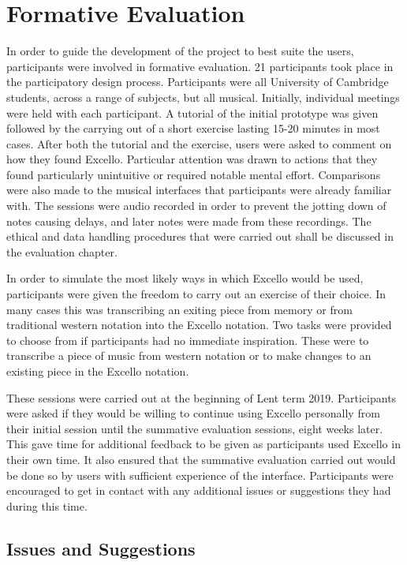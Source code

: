 \section{Formative Evaluation}

In order to guide the development of the project to best suite the users, participants were involved in formative evaluation. 21 participants took place in the participatory design process. Participants were all University of Cambridge students, across a range of subjects, but all musical. Initially, individual meetings were held with each participant. A tutorial of the initial prototype was given followed by the carrying out of a short exercise lasting 15-20 minutes in most cases. After both the tutorial and the exercise, users were asked to comment on how they found Excello. Particular attention was drawn to actions that they found particularly unintuitive or required notable mental effort. Comparisons were also made to the musical interfaces that participants were already familiar with. The sessions were audio recorded in order to prevent the jotting down of notes causing delays, and later notes were made from these recordings. The ethical and data handling procedures that were carried out shall be discussed in the evaluation chapter.

In order to simulate the most likely ways in which Excello would be used, participants were given the freedom to carry out an exercise of their choice. In many cases this was transcribing an exiting piece from memory or from traditional western notation into the Excello notation. Two tasks were provided to choose from if participants had no immediate inspiration. These were to transcribe a piece of music from western notation or to make changes to an existing piece in the Excello notation.

These sessions were carried out at the beginning of Lent term 2019. Participants were asked if they would be willing to continue using Excello personally from their initial session until the summative evaluation sessions, eight weeks later. This gave time for additional feedback to be given as participants used Excello in their own time. It also ensured that the summative evaluation carried out would be done so by users with sufficient experience of the interface. Participants were encouraged to get in contact with any additional issues or suggestions they had during this time.

\subsection{Issues and Suggestions}

